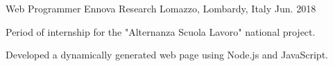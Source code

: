 \begin{cventries}
  \cventry
  {Web Programmer} %
  {Ennova Research} %
  {Lomazzo, Lombardy, Italy} %
  {Jun. 2018} %
  {
    \begin{cvitems} %
      \item {Period of internship for the "Alternanza Scuola Lavoro" national project.}
      \item {Developed a dynamically generated web page using Node.js and JavaScript.}
    \end{cvitems}
  }
\end{cventries}
